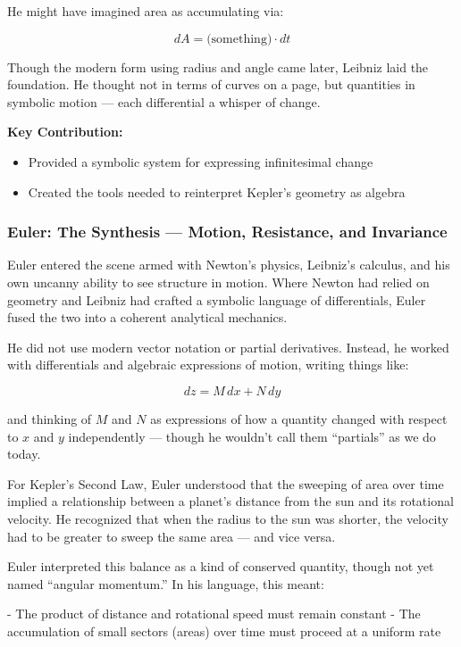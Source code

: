 He might have imagined area as accumulating via:

\[
dA = \text{(something)} \cdot dt
\]

Though the modern form using radius and angle came later, Leibniz laid the foundation. He thought not in terms of curves on a page, but quantities in symbolic motion — each differential a whisper of change.

\textbf{Key Contribution:}
\begin{itemize}
    \item Provided a symbolic system for expressing infinitesimal change
    \item Created the tools needed to reinterpret Kepler’s geometry as algebra
\end{itemize}

\subsubsection*{Euler: The Synthesis — Motion, Resistance, and Invariance}

Euler entered the scene armed with Newton’s physics, Leibniz’s calculus, and his own uncanny ability to see structure in motion. Where Newton had relied on geometry and Leibniz had crafted a symbolic language of differentials, Euler fused the two into a coherent analytical mechanics.

He did not use modern vector notation or partial derivatives. Instead, he worked with differentials and algebraic expressions of motion, writing things like:

\[
dz = M\,dx + N\,dy
\]

and thinking of \( M \) and \( N \) as expressions of how a quantity changed with respect to \( x \) and \( y \) independently — though he wouldn’t call them “partials” as we do today.

For Kepler’s Second Law, Euler understood that the sweeping of area over time implied a relationship between a planet’s distance from the sun and its rotational velocity. He recognized that when the radius to the sun was shorter, the velocity had to be greater to sweep the same area — and vice versa.

Euler interpreted this balance as a kind of conserved quantity, though not yet named “angular momentum.” In his language, this meant:

- The product of distance and rotational speed must remain constant
- The accumulation of small sectors (areas) over time must proceed at a uniform rate

